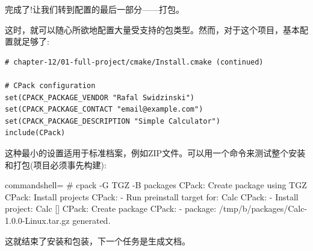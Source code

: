 完成了!让我们转到配置的最后一部分——打包。


这时，就可以随心所欲地配置大量受支持的包类型。然而，对于这个项目，基本配置就足够了:

\begin{lstlisting}[style=styleCMake]
# chapter-12/01-full-project/cmake/Install.cmake (continued)

# CPack configuration
set(CPACK_PACKAGE_VENDOR "Rafal Swidzinski")
set(CPACK_PACKAGE_CONTACT "email@example.com")
set(CPACK_PACKAGE_DESCRIPTION "Simple Calculator")
include(CPack)
\end{lstlisting}

这种最小的设置适用于标准档案，例如ZIP文件。可以用一个命令来测试整个安装和打包(项目必须事先构建):

\begin{tcblisting}{commandshell={}}
# cpack -G TGZ -B packages
CPack: Create package using TGZ
CPack: Install projects
CPack: - Run preinstall target for: Calc
CPack: - Install project: Calc []
CPack: Create package
CPack: - package: /tmp/b/packages/Calc-1.0.0-Linux.tar.gz
generated.
\end{tcblisting}

这就结束了安装和包装，下一个任务是生成文档。










